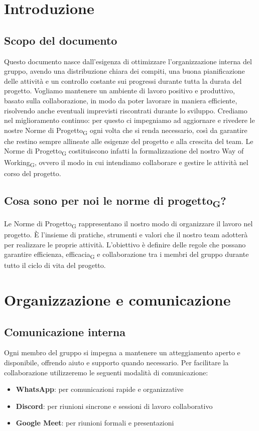 \documentclass[11pt,a4paper]{article}
\newcommand{\gls}[1]{#1\textsubscript{G}}
\begin{document}
\tableofcontents
\newpage

\section{Introduzione}
\subsection{Scopo del documento}
Questo documento nasce dall’esigenza di ottimizzare l’organizzazione interna del gruppo, avendo una distribuzione chiara dei compiti, una buona pianificazione delle attività e un controllo costante sui progressi durante tutta la durata del progetto. Vogliamo mantenere un ambiente di
lavoro positivo e produttivo, basato sulla collaborazione, in modo da poter lavorare in maniera efficiente, risolvendo anche eventuali imprevisti riscontrati durante lo sviluppo.
Crediamo nel miglioramento continuo: per questo ci impegniamo ad aggiornare e rivedere le nostre \gls{Norme di Progetto} ogni volta che si renda necessario, così da garantire che restino sempre allineate alle esigenze del progetto e alla crescita del team. Le \gls{Norme di Progetto} costituiscono infatti la formalizzazione del nostro \gls{Way of Working}, ovvero il modo in cui intendiamo collaborare e gestire le attività nel corso del progetto.

\subsection{Cosa sono per noi le \gls{norme di progetto}?}
Le \gls{Norme di Progetto} rappresentano il nostro modo di organizzare il lavoro nel progetto. È l’insieme di pratiche, strumenti e valori che il nostro team adotterà per realizzare le proprie attività. L’obiettivo è definire delle regole che possano garantire efficienza, \gls{efficacia} e collaborazione tra i membri del gruppo durante tutto il ciclo di vita del progetto.

\newpage

\section{Organizzazione e comunicazione}

\subsection{Comunicazione interna}
Ogni membro del gruppo si impegna a mantenere un atteggiamento aperto e disponibile, offrendo aiuto e supporto quando necessario. Per facilitare la collaborazione utilizzeremo le seguenti modalità di comunicazione:
\begin{itemize}
    \item \textbf{WhatsApp}: per comunicazioni rapide e organizzative
    \item \textbf{Discord}: per riunioni sincrone e sessioni di lavoro collaborativo
    \item \textbf{Google Meet}: per riunioni formali e presentazioni
\end{itemize}
\end{document}
